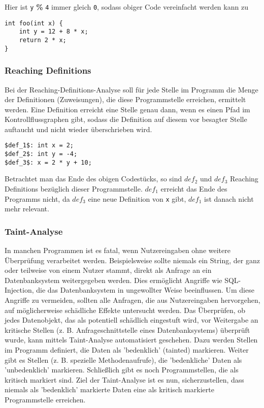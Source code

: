 Hier ist \lstinline|y| \textbf{\%} \lstinline|4| immer gleich \lstinline{0}, sodass obiger Code vereinfacht werden kann zu

\par

\begin{lstlisting}[frame=single, captionpos=b, caption=Mittels Constant-Bits-Analyse optimierte Version von Listing 4]
int foo(int x) {
	int y = 12 + 8 * x;
	return 2 * x;
} 
\end{lstlisting}

\subsubsection{Reaching Definitions}
Bei der Reaching-Definitions-Analyse soll für jede Stelle im Programm die Menge der Definitionen (Zuweisungen), die diese Programmstelle erreichen, ermittelt werden.
Eine Definition erreicht eine Stelle genau dann, wenn es einen Pfad im Kontrollflussgraphen gibt, sodass die Definition auf diesem vor besagter Stelle auftaucht und nicht wieder überschrieben wird.

\par

\begin{lstlisting}[frame=single, captionpos=b, caption=Beispielcode für Reaching-Definitions-Analyse]
$def_1$: int x = 2;
$def_2$: int y = -4;
$def_3$: x = 2 * y + 10; 
\end{lstlisting}

\par

Betrachtet man das Ende des obigen Codestücks, so sind $def_2$ und $def_3$ Reaching Definitions bezüglich dieser Programmstelle.
$def_1$ erreicht das Ende des Programms nicht, da $def_3$ eine neue Definition von \lstinline{x} gibt, $def_1$ ist danach nicht mehr relevant.

\subsubsection{Taint-Analyse}
In manchen Programmen ist es fatal, wenn Nutzereingaben ohne weitere Überprüfung verarbeitet werden. 
Beispielsweise sollte niemals ein String, der ganz oder teilweise von einem Nutzer stammt, direkt als Anfrage an ein Datenbanksystem weitergegeben werden.
Dies ermöglicht Angriffe wie SQL-Injection, die das Datenbanksystem in ungewollter Weise beeinflussen.
Um diese Angriffe zu vermeiden, sollten alle Anfragen, die aus Nutzereingaben hervorgehen, auf möglicherweise schädliche Effekte untersucht werden.
Das Überprüfen, ob jedes Datenobjekt, das als potentiell schädlich eingestuft wird, vor Weitergabe an kritische Stellen (z. B. Anfrageschnittstelle eines Datenbanksystems) überprüft wurde, kann mittels Taint-Analyse automatisiert geschehen.
Dazu werden Stellen im Programm definiert, die Daten als 'bedenklich' (tainted) markieren.
Weiter gibt es Stellen (z. B. spezielle Methodenaufrufe), die 'bedenkliche' Daten als 'unbedenklich' markieren.
Schließlich gibt es noch Programmstellen, die als kritisch markiert sind.
Ziel der Taint-Analyse ist es nun, sicherzustellen, dass niemals als 'bedenklich' markierte Daten eine als kritisch markierte Programmstelle erreichen.

